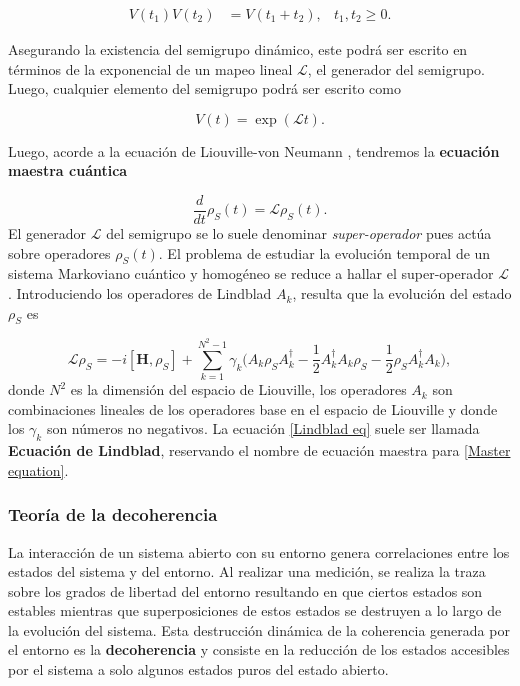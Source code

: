 \begin{align}
    V(t_1)V(t_2) & = V(t_1+ t_2), & t_1,t_2 \geq 0.
\end{align}

Asegurando la existencia del semigrupo dinámico, este podrá ser escrito en términos de la exponencial de un mapeo lineal $\mathcal{L}$, el generador del semigrupo. Luego, cualquier elemento del semigrupo podrá ser escrito como

\begin{equation}
    V(t) = \exp(\mathcal{L}t).
\end{equation}

Luego, acorde a la ecuación de Liouville-von Neumann  \cite{HeinzPetruccione,PATHRIA2011115}, tendremos la \textbf{ecuación maestra cuántica}

\begin{equation}
    \frac{d}{dt} \rho_S(t) =\mathcal{L}\rho_S(t). 
    \label{Lindblad eq}
\end{equation}
El generador $\mathcal{L}$ del semigrupo se lo suele denominar \textit{super-operador} pues actúa sobre operadores $\rho_S(t)$. El problema de estudiar la evolución temporal de un sistema Markoviano cuántico y homogéneo se reduce a hallar
el super-operador $\mathcal{L}$. Introduciendo los operadores de Lindblad $A_k$, resulta que la evolución del estado $\rho_S$ es

\begin{equation}
    \mathcal{L}\rho_S = -i [\mathbf{H}, \rho_S] + \sum_{k=1}^{N^2-1} \gamma_k \bigg(A_k \rho_S A_k^{\dagger}-\frac{1}{2}A_{k}^{\dagger}A_k \rho_S-\frac{1}{2}\rho_S A_{k}^{\dagger}A_k\bigg),
    \label{Master equation}
\end{equation}
donde $N^2$ es la dimensión del espacio de Liouville, los operadores $A_k$ son combinaciones lineales de los operadores base en el espacio de Liouville y donde los $\gamma_k$ son números no negativos. La ecuación \eqref{Lindblad eq} suele ser llamada \textbf{Ecuación de Lindblad}, reservando el nombre de ecuación maestra para \eqref{Master equation}.

\subsubsection{Teoría de la decoherencia}


La interacción de un sistema abierto con su entorno genera correlaciones entre los estados del sistema y del entorno. Al realizar una medición, se realiza la traza sobre los grados de libertad del entorno resultando en que ciertos estados son estables mientras que superposiciones de estos estados se destruyen a lo largo de la evolución del sistema. Esta destrucción dinámica de la coherencia generada por el entorno es la \textbf{decoherencia} y consiste en la reducción de los estados accesibles por el sistema a solo algunos estados puros del estado abierto. 

